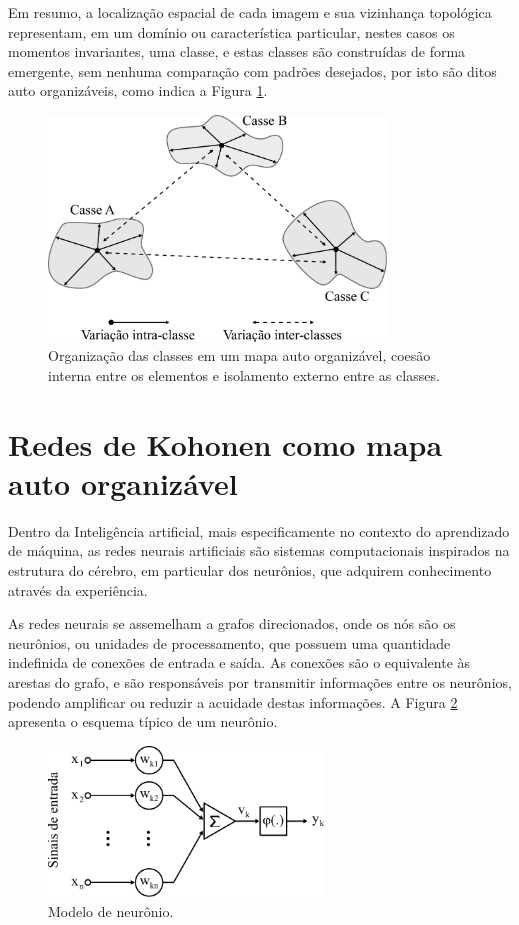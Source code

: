 Em resumo, a localização espacial de cada imagem e sua vizinhança topológica
representam, em um domínio ou característica particular, nestes casos os
momentos invariantes, uma classe, e estas classes são construídas de forma
emergente, sem nenhuma comparação com padrões desejados, por isto são ditos
auto organizáveis, como indica a Figura \ref{fig:mapa_classes_dist}.

\begin{figure}[H]
  \begin{center}
    \includegraphics[height=6cm]{imagens/mapa_classes_dist.pdf}
  \end{center}
  \caption{ Organização das classes em um mapa auto organizável, coesão interna
    entre os elementos e isolamento externo entre as classes. }
  \label{fig:mapa_classes_dist}
\end{figure}

\section{Redes de Kohonen como mapa auto organizável}\label{sec:redes_kohonen_mapas}

Dentro da Inteligência artificial, mais especificamente no contexto do
aprendizado de máquina, as redes neurais artificiais são sistemas computacionais
inspirados na estrutura do cérebro, em particular dos neurônios, que adquirem
conhecimento através da experiência.

As redes neurais se assemelham a grafos direcionados, onde os nós são os
neurônios, ou unidades de processamento, que possuem uma quantidade indefinida
de conexões de entrada e saída. As conexões são o equivalente às arestas do
grafo, e são responsáveis por transmitir informações entre os neurônios, podendo
amplificar ou reduzir a acuidade destas informações. A Figura \ref{fig:neuronio}
apresenta o esquema típico de um neurônio.

\begin{figure}[H]
  \begin{center}
    \includegraphics[height=4cm]{imagens/neuronio.pdf}
  \end{center}
  \caption{ Modelo de neurônio. }
  \label{fig:neuronio}
\end{figure}

